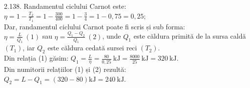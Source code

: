 2.138. Randamentul ciclului Carnot este:\\ $\eta=1-\frac{T_{2}}{T_{1}}=1-\frac{300}{400}=1-\frac{3}{4}=1-0,75=0,25$;\\ Dar, randamentul ciclului Carnot poate fi scris și sub forma:\\ $\eta=\frac{L}{Q_{1}}\ (1)$ sau $\eta=\frac{Q_{1}-Q_{2}}{Q_{1}}\ (2)$, unde $Q_{1}$ este căldura primită de la sursa caldă $\left(T_{1}\right)$, iar $Q_{2}$ este căldura cedată sursei reci $\left(T_{2}\right)$.\\ Din relația (1) găsim: $Q_{1}=\frac{L}{\eta}=\frac{80}{0,25} \mathrm{~kJ}=\frac{8000}{25} \mathrm{~kJ}=320 \mathrm{~kJ}$.\\ Din numitorii relațiilor (1) și (2) rezultă:\\ $Q_{2}=L-Q_{1}=(320-80) \mathrm{kJ}=240 \mathrm{~kJ}$.\\

